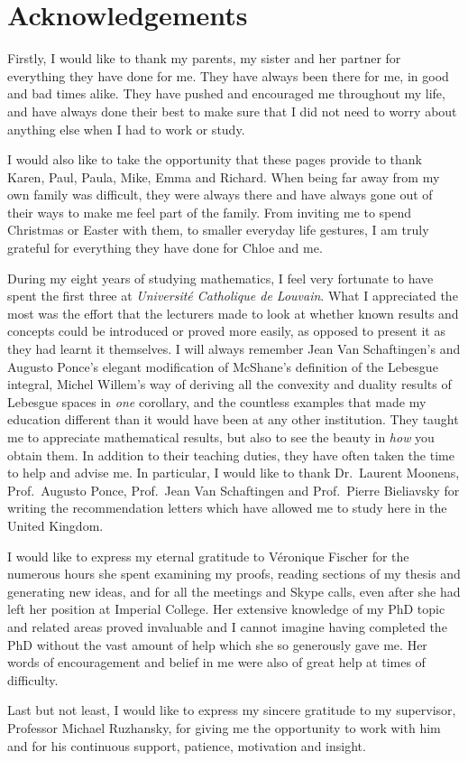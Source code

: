 \chapter*{Acknowledgements}

Firstly, I would like to thank my parents, my sister and her partner for everything they have done for me.
They have always been there for me,
in good and bad times alike.
They have pushed and encouraged me throughout my life,
and have always done their best to make sure that I did not need to worry about anything else when I had to work or study.

I would also like to take the opportunity that these pages provide to thank Karen, Paul, Paula, Mike, Emma and Richard.
When being far away from my own family was difficult,
they were always there and have always gone out of their ways to make me feel part of the family.
From inviting me to spend Christmas or Easter with them,
to smaller everyday life gestures,
I am truly grateful for everything they have done for Chloe and me.

During my eight years of studying mathematics,
I feel very fortunate to have spent the first three at \emph{Universit\'e Catholique de Louvain}.
What I appreciated the most was the effort that the lecturers made to look at
whether known results and concepts could be introduced or proved more easily,
as opposed to present it as they had learnt it themselves.
I will always remember Jean Van Schaftingen's and Augusto Ponce's elegant modification of McShane's definition of the Lebesgue integral,
Michel Willem's way of deriving all the convexity and duality results of Lebesgue spaces in \emph{one} corollary,
and the countless examples that made my education different than it would have been at any other institution.
They taught me to appreciate mathematical results,
but also to see the beauty in \emph{how} you obtain them.
In addition to their teaching duties,
they have often taken the time to help and advise me.
In particular,
I would like to thank Dr.\ Laurent Moonens,
Prof.\ Augusto Ponce, Prof.\ Jean Van Schaftingen and Prof.\ Pierre Bieliavsky for writing the recommendation letters which have allowed me to study here in the United Kingdom.

I would like to express my eternal gratitude to V\'eronique Fischer for the numerous hours she spent examining my proofs,
reading sections of my thesis and generating new ideas,
and for all the meetings and Skype calls,
even after she had left her position at Imperial College.
Her extensive knowledge of my PhD topic and related areas proved invaluable and
I cannot imagine having completed the PhD without the vast amount of help which she so generously gave me.
Her words of encouragement and belief in me were also of great help at times of difficulty.

Last but not least,
I would like to express my sincere gratitude to my supervisor,
Professor Michael Ruzhansky,
for giving me the opportunity to work with him and for his continuous support, patience, motivation and insight.
